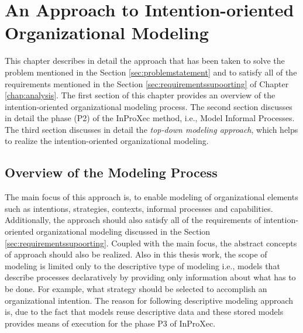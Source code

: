 \chapter{An Approach to Intention-oriented Organizational Modeling}
\label{chap:approach}
This chapter describes in detail the approach that has been taken to solve the problem mentioned in the Section \ref{sec:problemstatement}  and to satisfy all of the requirements mentioned in the Section \ref{sec:requirementssupoorting} of Chapter \ref{chap:analysis}. The first section of this chapter provides an overview of the intention-oriented organizational modeling process. The second section discusses in detail the phase (P2) of the InProXec method, i.e., Model Informal Processes. The third section discusses in detail the \textit{top-down modeling approach}, which helps to realize the intention-oriented organizational modeling. 

\section{Overview of the Modeling Process}
\label{sec:overviewmodelingprocess}
The main focus of this approach is, to enable modeling of organizational elements such as intentions, strategies, contexts, informal processes and capabilities. Additionally, the approach should also satisfy all of the requirements of intention-oriented organizational modeling discussed in the Section \ref{sec:requirementssupoorting}. Coupled with the main focus, the abstract concepts of approach should also be realized. Also in this thesis work, the scope of modeling is limited only to the descriptive type of modeling i.e., models that describe processes declaratively by providing only information about what has to be done. For example, what strategy should be selected to accomplish an organizational intention. The reason for following descriptive modeling approach is, due to the fact that models reuse descriptive data and these stored models provides means of execution for the phase P3 of InProXec. 

